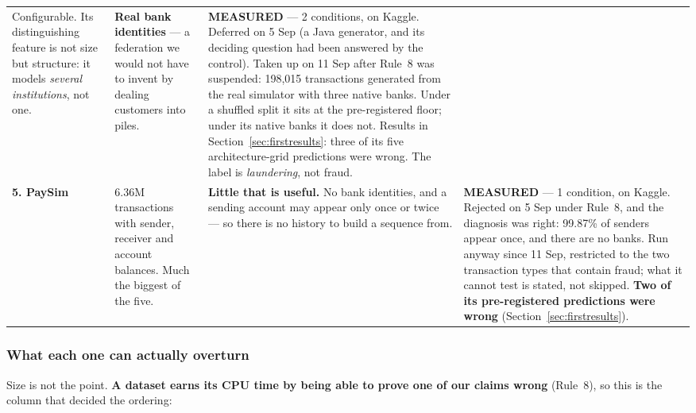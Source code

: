 \documentclass[11pt]{article}
\begin{document}
{\begin{xltabular}{\linewidth}{@{}>{\raggedright\arraybackslash}p{2.45cm} >{\raggedright\arraybackslash}p{3.5cm} >{\raggedright\arraybackslash}p{3.15cm} X@{}}
Configurable. Its distinguishing feature is not size but structure: it models \emph{several institutions}, not one. &
\textbf{Real bank identities} --- a federation we would not have to invent by dealing customers into piles. &
\textcolor{okgreen}{\textbf{MEASURED}} --- 2 conditions, on Kaggle. Deferred on 5 Sep (a Java generator, and its deciding question had been answered by the control). Taken up on 11 Sep after Rule~8 was suspended: 198{,}015 transactions generated from the real simulator with three native banks. Under a shuffled split it sits at the pre-registered floor; under its native banks it does not. Results in Section~\ref{sec:firstresults}: three of its five architecture-grid predictions were wrong. The label is \emph{laundering}, not fraud. \\
\textbf{5. PaySim}  &
6.36M transactions with sender, receiver and account balances. Much the biggest of the five. &
\textbf{Little that is useful.} No bank identities, and a sending account may appear only once or twice --- so there is no history to build a sequence from. &
\textcolor{okgreen}{\textbf{MEASURED}} --- 1 condition, on Kaggle. Rejected on 5 Sep under Rule~8, and the diagnosis was right: 99.87\% of senders appear once, and there are no banks. Run anyway since 11 Sep, restricted to the two transaction types that contain fraud; what it cannot test is stated, not skipped. \textbf{Two of its pre-registered predictions were wrong} (Section~\ref{sec:firstresults}). \\
\bottomrule
\end{xltabular}}

\subsubsection*{What each one can actually overturn}

Size is not the point. \textbf{A dataset earns its CPU time by being able to prove one of our claims
wrong} (Rule~8), so this is the column that decided the ordering:
\end{document}

